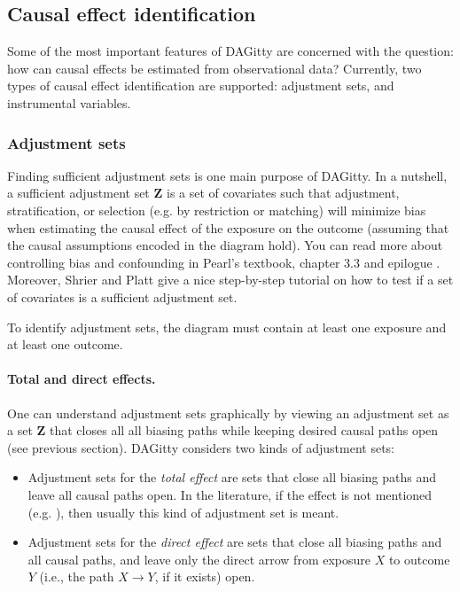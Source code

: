 \documentclass[a4paper]{article} %
\newcommand{\pp}{{\sc DAG}itty\xspace}
\begin{document}
\subsection{Causal effect identification}

Some of the most important features of \pp are concerned with the question: how
can causal effects be estimated from observational data? Currently, two types of causal
effect identification are supported: adjustment sets, and instrumental variables.

\subsubsection{Adjustment sets}

\label{sec:adjustment}

Finding sufficient adjustment sets is one main purpose 
of \pp. In a nutshell, a sufficient adjustment
set $\mathbf{Z}$ is a set of covariates such that adjustment,
stratification, or selection (e.g. by restriction or 
matching) will minimize bias when estimating the causal 
effect of the exposure on the outcome (assuming that
the causal assumptions encoded in the diagram hold). 
You can read more about controlling bias and confounding in Pearl's textbook, 
chapter 3.3 and epilogue \cite{Pearl2009}. 
Moreover, Shrier and Platt \cite{ShrierP2008} 
give a nice step-by-step tutorial on how to test if a set of covariates
is a sufficient adjustment set.

To identify adjustment sets, the diagram must contain at least
one exposure and at least one outcome.

\paragraph{Total and direct effects.}
One can understand adjustment sets graphically by viewing an adjustment set
as a set $\mathbf{Z}$ that closes all all biasing 
paths while keeping desired causal paths open
(see previous section).
\pp considers two kinds of adjustment sets: 

\begin{itemize}
 \item Adjustment sets for the \emph{total effect} are sets that 
close all biasing paths and leave all causal paths
open. 
 In the literature, if the effect is not mentioned
(e.g. \cite{ShrierP2008,KnueppelS2010}), then usually
this kind of adjustment set is meant.
 \item   Adjustment sets for the \emph{direct effect} are sets that 
close all biasing paths and all causal paths, and leave only 
the direct arrow from exposure $X$ to outcome $Y$ (i.e., the path
$X \rightarrow Y$, if it exists) open.
\end{itemize}
\end{document}
